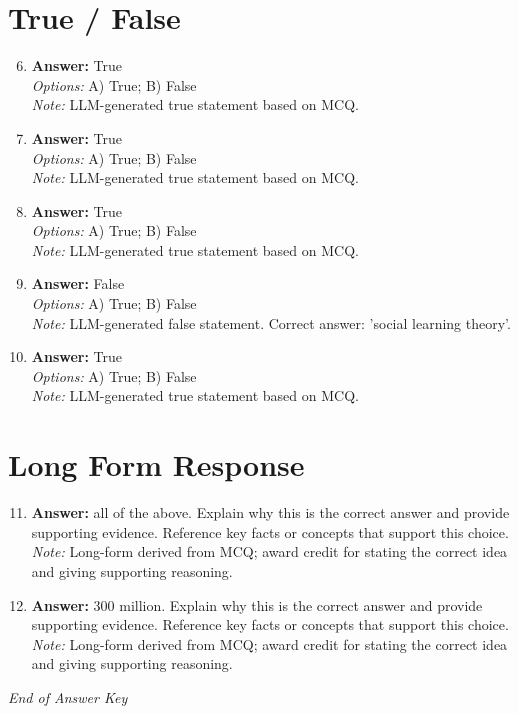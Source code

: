 \documentclass[12pt]{article}
\begin{document}
\section*{True / False}
\begin{enumerate}[label=\arabic*.]
\setcounter{enumi}{5}
\item \textbf{Answer:} True
\\ \textit{Options:} A) True; B) False
\\ \textit{Note:} LLM-generated true statement based on MCQ.
\item \textbf{Answer:} True
\\ \textit{Options:} A) True; B) False
\\ \textit{Note:} LLM-generated true statement based on MCQ.
\item \textbf{Answer:} True
\\ \textit{Options:} A) True; B) False
\\ \textit{Note:} LLM-generated true statement based on MCQ.
\item \textbf{Answer:} False
\\ \textit{Options:} A) True; B) False
\\ \textit{Note:} LLM-generated false statement. Correct answer: 'social learning theory'.
\item \textbf{Answer:} True
\\ \textit{Options:} A) True; B) False
\\ \textit{Note:} LLM-generated true statement based on MCQ.
\end{enumerate}

\section*{Long Form Response}
\begin{enumerate}[label=\arabic*.]
\setcounter{enumi}{10}
\item \textbf{Answer:} all of the above. Explain why this is the correct answer and provide supporting evidence. Reference key facts or concepts that support this choice.
\\ \textit{Note:} Long-form derived from MCQ; award credit for stating the correct idea and giving supporting reasoning.
\item \textbf{Answer:} 300 million. Explain why this is the correct answer and provide supporting evidence. Reference key facts or concepts that support this choice.
\\ \textit{Note:} Long-form derived from MCQ; award credit for stating the correct idea and giving supporting reasoning.
\end{enumerate}

\vfill
\noindent\textit{End of Answer Key}
\end{document}
